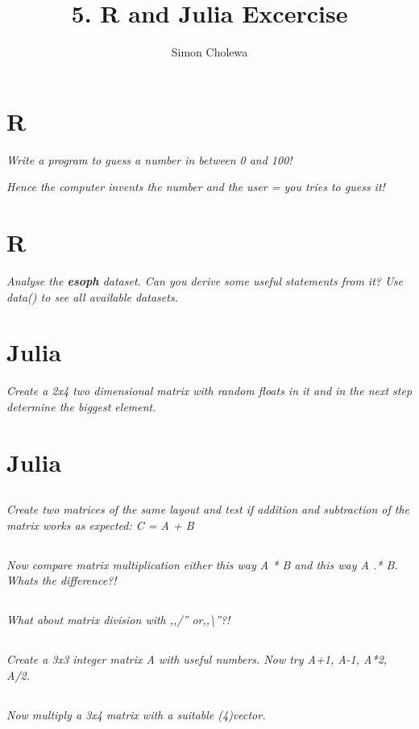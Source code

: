 \documentclass[11pt,a4paper]{article}
\author{Simon Cholewa}
\title{5. R and Julia Excercise}
\begin{document}
\maketitle

\section{R}
\textit{Write a program to guess a number in between 0 and 100!}

\textit{Hence the computer invents the number and the user = you tries to guess it! }


\section{R}
\textit{Analyse the \textbf{esoph} dataset. Can you derive some useful statements from it? Use data() to see all available datasets. }


\section{Julia}
\textit{Create a 2x4 two dimensional matrix with random floats in it and in the next step determine the biggest element.}

\section{Julia}
\subsection{}
\textit{Create two matrices of the same layout and test if addition and subtraction of the matrix works as expected: C = A + B}

\subsection{}
\textit{Now compare matrix multiplication either this way A * B and this way A .* B. Whats the difference?!}

\subsection{}
\textit{What about matrix division with ,,/'' or,,\textbackslash''?!}

\subsection{}
\textit{Create a 3x3 integer matrix A with useful numbers. Now try A+1, A-1, A*2, A/2.}

\subsection{}
\textit{Now multiply a 3x4 matrix with a suitable (4)vector. }
\end{document}
